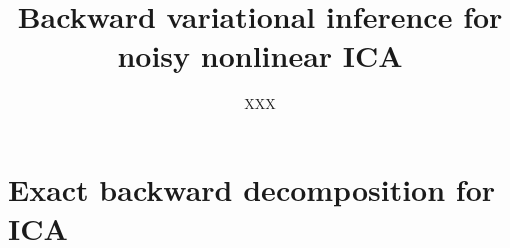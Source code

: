 \documentclass{article}
\title{Backward variational inference for noisy nonlinear ICA}
\date{}
\author[$\dag$]{XXX}
\affil[$\dag$]{{\small }}
\newcommand{\1}{\mathbbm{1}}
\begin{document}
\maketitle

\begin{abstract}

\end{abstract}


\section{Exact backward decomposition for ICA}

\end{document}
